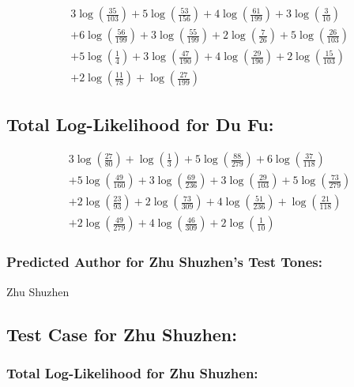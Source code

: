 \documentclass[12pt]{article}
\begin{document}
\begin{align*}
& 3 \log\left(\frac{35}{103}\right) + 5 \log\left(\frac{53}{156}\right) + 4 \log\left(\frac{61}{199}\right) + 3 \log\left(\frac{3}{10}\right) \\
& + 6 \log\left(\frac{56}{199}\right) + 3 \log\left(\frac{55}{199}\right) + 2 \log\left(\frac{7}{26}\right) + 5 \log\left(\frac{26}{103}\right) \\
& + 5 \log\left(\frac{1}{4}\right) + 3 \log\left(\frac{47}{190}\right) + 4 \log\left(\frac{29}{190}\right) + 2 \log\left(\frac{15}{103}\right) \\
& + 2 \log\left(\frac{11}{78}\right) + \log\left(\frac{27}{199}\right)
\end{align*}

\subsection*{Total Log-Likelihood for Du Fu:}

\begin{align*}
& 3 \log\left(\frac{27}{80}\right) + \log\left(\frac{1}{3}\right) + 5 \log\left(\frac{88}{279}\right) + 6 \log\left(\frac{37}{118}\right) \\
& + 5 \log\left(\frac{49}{160}\right) + 3 \log\left(\frac{69}{236}\right) + 3 \log\left(\frac{29}{103}\right) + 5 \log\left(\frac{73}{279}\right) \\
& + 2 \log\left(\frac{23}{93}\right) + 2 \log\left(\frac{73}{309}\right) + 4 \log\left(\frac{51}{236}\right) + \log\left(\frac{21}{118}\right) \\
& + 2 \log\left(\frac{49}{279}\right) + 4 \log\left(\frac{46}{309}\right) + 2 \log\left(\frac{1}{10}\right)
\end{align*}

\subsubsection*{Predicted Author for Zhu Shuzhen's Test Tones:}
Zhu Shuzhen

\subsection*{Test Case for Zhu Shuzhen: }

\subsubsection*{Total Log-Likelihood for Zhu Shuzhen:}
\end{document}
